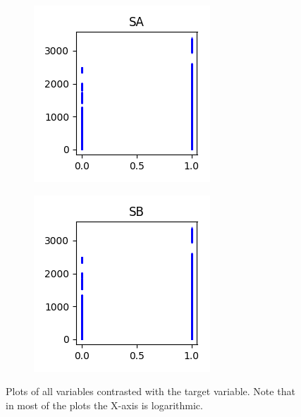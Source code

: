 \documentclass[sigconf,authorversion]{acmart}
\begin{document}
\begin{figure}[hbtp]\ContinuedFloat
    \centering
    \begin{subfigure}[b]{0.3\textwidth}
        \includegraphics[width=\textwidth]{img/SA.png}
        \label{fig:sa}
    \end{subfigure}
    \begin{subfigure}[b]{0.3\textwidth}
        \includegraphics[width=\textwidth]{img/SB.png}
        \label{fig:sb}
    \end{subfigure}
    \caption{Plots of all variables contrasted with the target variable. Note that in most of the plots the X-axis is logarithmic.}
    \label{fig:plots}
\end{figure}
\end{document}
